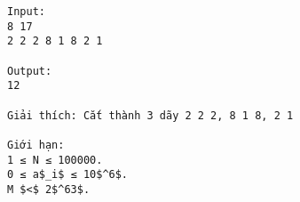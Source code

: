 \begin{verbatim}
Input:
8 17
2 2 2 8 1 8 2 1

Output:
12

Giải thích: Cắt thành 3 dãy 2 2 2, 8 1 8, 2 1

Giới hạn:
1 ≤ N ≤ 100000.
0 ≤ a$_i$ ≤ 10$^6$.
M $<$ 2$^63$.

\end{verbatim}